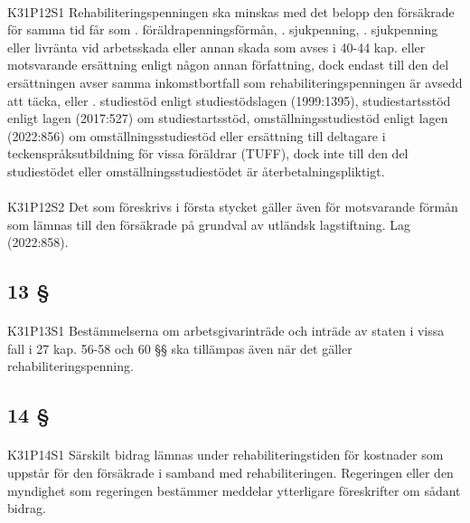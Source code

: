 \documentclass[a4paper,notitlepage,openany,10pt]{book}
\begin{document}
\paragraph*{}
{\tiny K31P12S1}
Rehabiliteringspenningen ska minskas med det belopp den försäkrade för samma tid får som
. föräldrapenningsförmån,
. sjukpenning,
. sjukpenning eller livränta vid arbetsskada eller annan skada som avses i 40-44 kap. eller motsvarande ersättning enligt någon annan författning, dock endast till den del ersättningen avser samma inkomstbortfall som rehabiliteringspenningen är avsedd att täcka, eller
. studiestöd enligt studiestödslagen (1999:1395), studiestartsstöd enligt lagen (2017:527) om studiestartsstöd, omställningsstudiestöd enligt lagen (2022:856) om omställningsstudiestöd eller ersättning till deltagare i teckenspråksutbildning för vissa föräldrar (TUFF), dock inte till den del studiestödet eller omställningsstudiestödet är återbetalningspliktigt.
\paragraph*{}
{\tiny K31P12S2}
Det som föreskrivs i första stycket gäller även för motsvarande förmån som lämnas till den försäkrade på grundval av utländsk lagstiftning.
Lag (2022:858).
\subsection*{13 §}
\paragraph*{}
{\tiny K31P13S1}
Bestämmelserna om arbetsgivarinträde och inträde av staten i vissa fall i 27 kap. 56-58 och 60 §§ ska tillämpas även när det gäller rehabiliteringspenning.
\subsection*{14 §}
\paragraph*{}
{\tiny K31P14S1}
Särskilt bidrag lämnas under rehabiliteringstiden för kostnader som uppstår för den försäkrade i samband med rehabiliteringen. Regeringen eller den myndighet som regeringen bestämmer meddelar ytterligare föreskrifter om sådant bidrag.
\end{document}
